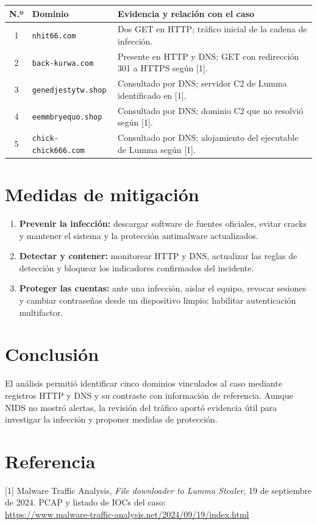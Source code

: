 \documentclass[12pt,a4paper]{article}
\begin{document}
\begingroup
\small
\renewcommand{\arraystretch}{1.6}
\begin{tabularx}{\linewidth}{@{}c p{5.1cm} X@{}}
\toprule
N.º & Dominio & Evidencia y relación con el caso \\
\midrule
1 & \nolinkurl{nhit66.com} & Dos GET en HTTP; tráfico inicial de la cadena de infección. \\
2 & \nolinkurl{back-kurwa.com} & Presente en HTTP y DNS; GET con redirección 301 a HTTPS según [1]. \\
3 & \nolinkurl{genedjestytw.shop} & Consultado por DNS; servidor C2 de Lumma identificado en [1]. \\
4 & \nolinkurl{eemmbryequo.shop} & Consultado por DNS; dominio C2 que no resolvió según [1]. \\
5 & \nolinkurl{chick-chick666.com} & Consultado por DNS; alojamiento del ejecutable de Lumma según [1]. \\
\bottomrule
\end{tabularx}
\par\endgroup

\section{Medidas de mitigación}
\begin{enumerate}[itemsep=5pt]
\item \textbf{Prevenir la infección:} descargar software de fuentes oficiales, evitar cracks y mantener el sistema y la protección antimalware actualizados.
\item \textbf{Detectar y contener:} monitorear HTTP y DNS, actualizar las reglas de detección y bloquear los indicadores confirmados del incidente.
\item \textbf{Proteger las cuentas:} ante una infección, aislar el equipo, revocar sesiones y cambiar contraseñas desde un dispositivo limpio; habilitar autenticación multifactor.
\end{enumerate}

\clearpage
\section{Conclusión}
El análisis permitió identificar cinco dominios vinculados al caso mediante registros HTTP y DNS y su contraste con información de referencia. Aunque NIDS no mostró alertas, la revisión del tráfico aportó evidencia útil para investigar la infección y proponer medidas de protección.

\section*{Referencia}
[1] Malware Traffic Analysis, \textit{File downloader to Lumma Stealer}, 19 de septiembre de 2024. PCAP y listado de IOCs del caso:\\
\url{https://www.malware-traffic-analysis.net/2024/09/19/index.html}
\end{document}
